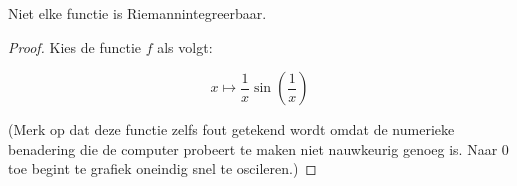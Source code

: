\documentclass[main.tex]{subfiles}
\begin{document}
\begin{tvb}
  Niet elke functie is Riemannintegreerbaar.

\begin{proof}
  Kies de functie $f$ als volgt:

  \noindent
  \begin{minipage}{.45\textwidth}
    \begin{figure}[H]
      \centering
    \end{figure}
  \end{minipage}
  \begin{minipage}{.45\textwidth}
    \[ x \mapsto \frac{1}{x}\sin\left(\frac{1}{x}\right) \]
  \end{minipage}

  \noindent(Merk op dat deze functie zelfs fout getekend wordt omdat de numerieke benadering die de computer probeert te maken niet nauwkeurig genoeg is. Naar $0$ toe begint te grafiek oneindig snel te oscileren.)
\end{proof}
\end{tvb}
\end{document}
